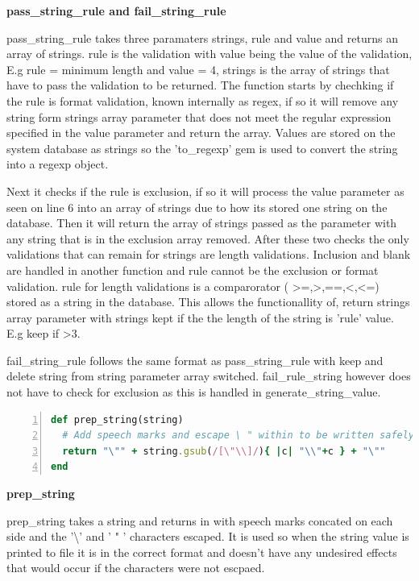 \documentclass[a4paper,12pt]{article}
\begin{document}
\par \textbf{pass\_string\_rule and fail\_string\_rule}
\par pass\_string\_rule takes three paramaters strings, rule and value and returns an array of strings. rule is the validation with value being the value of the validation, E.g rule = minimum length and value = 4, strings is the array of strings that have to pass the validation to be returned. The function starts by chechking if the rule is format validation, known internally as regex, if so it will remove any string form strings array parameter that does not meet the regular expression specified in the value parameter and return the array. Values are stored on the system database as strings so the 'to\_regexp' gem\cite{regexpstrgem} is used to convert the string into a regexp object.
\par Next it checks if the rule is exclusion, if so it will process the value parameter as seen on line 6 into an array of strings due to how its stored one string on the database. Then it will return the array of strings passed as the parameter with any string that is in the exclusion array removed. After these two checks the only validations that can remain for strings are length validations. Inclusion and blank are handled in another function and rule cannot be the exclusion or format validation. rule for length validations is a comparorator ( \textgreater=,\textgreater,==,\textless,\textless=) stored as a string in the database. This allows the functionallity of, return strings array parameter with strings kept if the the length of the string is 'rule' value. E.g keep if \textgreater 3.
\par fail\_string\_rule follows the same format as pass\_string\_rule with keep and delete string from string parameter array switched. fail\_rule\_string however does not have to check for exclusion as this is handled in generate\_string\_value.


\begin{lstlisting}[frame=single,numbers=left,language = ruby,caption= {prep\_string}, label={code:prepstr}]
def prep_string(string)
  # Add speech marks and escape \ " within to be written safely to test file
  return "\"" + string.gsub(/[\"\\]/){ |c| "\\"+c } + "\""
end
\end{lstlisting}

\par \textbf{prep\_string}
\par prep\_string takes a string and returns in with speech marks concated on each side and the '\textbackslash' and ' " ' characters escaped. It is used so when the string value is printed to file it is in the correct format and doesn't have any undesired effects that would occur if the characters were not escpaed.
\end{document}
